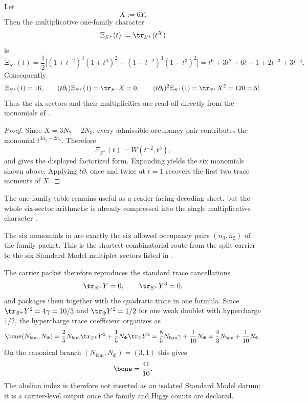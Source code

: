 \begin{corollary}
\label{cor:multiplicative-family-character}
Let
\[
X:=6Y.
\]
Then the multiplicative one-family character
\[
\Xi_{S^+}(t):=\tr_{S^+}(t^X)
\]
is
\begin{equation}
\label{eq:multiplicative-family-character}
\Xi_{S^+}(t)
=
\frac12\Big[
(1+t^{-2})^3(1+t^3)^2
+
(1-t^{-2})^3(1-t^3)^2
\Big]
=
t^6+3t^2+6t+1+2t^{-3}+3t^{-4}.
\end{equation}
Consequently
\[
\Xi_{S^+}(1)=16,
\qquad
(t\partial_t)\Xi_{S^+}(1)=\tr_{S^+}X=0,
\qquad
(t\partial_t)^2\Xi_{S^+}(1)=\tr_{S^+}X^2=120=5!.
\]
Thus the six sectors and their multiplicities are read off directly from the monomials of
.
\end{corollary}

\begin{proof}
Since $X=3N_2-2N_3$, every admissible occupancy pair contributes the monomial
$t^{3n_2-2n_3}$. Therefore
\[
\Xi_{S^+}(t)=W(t^{-2},t^3),
\]
and  gives the displayed factorized form. Expanding yields the six
monomials shown above. Applying $t\partial_t$ once and twice at $t=1$ recovers the first two trace
moments of $X$.
\end{proof}

\begin{remark}
The one-family table remains useful as a reader-facing decoding sheet, but the whole six-sector
arithmetic is already compressed into the single multiplicative character
.
\end{remark}

\begin{remark}
The six monomials in  are exactly the six allowed occupancy pairs $(n_3,n_2)$ of the family packet. This is the shortest combinatorial route from the split carrier to the six Standard Model multiplet sectors listed in .
\end{remark}

The carrier packet therefore reproduces the standard trace cancellations
\[
\tr_{S^+}Y=0,
\qquad
\tr_{S^+}Y^3=0,
\]
and packages them together with the quadratic trace in one formula. Since $\tr_{S^+}Y^2=4\gamma=10/3$ and $\tr_\Phi Y^2=1/2$ for one weak doublet with hypercharge $1/2$, the hypercharge trace coefficient organizes as
\begin{equation}
\label{eq:abelian-index}
\bone(N_{\mathrm{fam}},N_\Phi)
=
\frac25N_{\mathrm{fam}}\tr_{S^+}Y^2+\frac15N_\Phi\tr_\Phi Y^2
=
\frac85N_{\mathrm{fam}}\gamma+\frac1{10}N_\Phi
=
\frac43N_{\mathrm{fam}}+\frac1{10}N_\Phi.
\end{equation}
On the canonical branch $(N_{\mathrm{fam}},N_\Phi)=(3,1)$ this gives
\[
\bone=\frac{41}{10}.
\]
The abelian index is therefore not inserted as an isolated Standard Model datum; it is a carrier-level output once the family and Higgs counts are declared.

